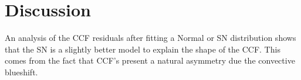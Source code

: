 \documentclass[11pt, oneside]{article}
\begin{document}


\section{Discussion} \label{sec:discu}

An analysis of the CCF residuals after fitting a Normal or SN distribution shows that the SN is a slightly better model to explain the shape of the CCF. This comes from the fact that CCF's present a natural asymmetry due the convective blueshift.
\end{document}
